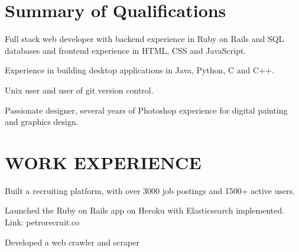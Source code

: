 \documentclass[letterpaper]{kevin-resume}
\begin{document}

\begin{minipage}[t]{0.8\textwidth}


\section{Summary of Qualifications}
\sectionspace
\begin{tightitemize}
\item
\item Full stack web developer with backend experience in Ruby on Rails and SQL databases and frontend experience in HTML, CSS and JavaScript.
\item Experience in building desktop applications in Java, Python, C and C++.
\item Unix user and user of git version control.
\item Passionate designer, several years of Photoshop experience for digital painting and graphics design.
\end{tightitemize}
\sectionspace

\section{WORK EXPERIENCE}

\sectionspace
{}
\begin{tightitemize}
\item Built a recruiting platform, with over 3000 job postings and 1500+ active users.
\item Launched the Ruby on Rails app on Heroku with Elasticsearch implemented. Link: petrorecruit.co
\item Developed a web crawler and scraper
\end{tightitemize}
\sectionspace %


\end{minipage}
\end{document}
